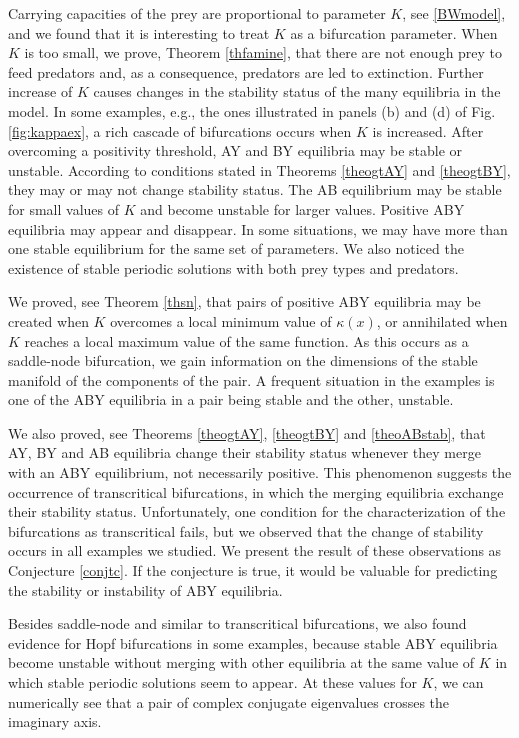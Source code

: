\documentclass[12pt]{article}
\theoremstyle{definition}
\begin{document}
Carrying capacities of the prey are proportional to parameter $K$, see \eqref{BWmodel}, and we found that it is interesting to treat $K$ as a bifurcation parameter. When $K$ is too small, we prove, Theorem \ref{thfamine}, that there are not enough prey to feed predators and, as a consequence, predators are led to extinction. Further increase of $K$ causes changes in the stability status of the many equilibria in the model. In some examples, e.g., the ones illustrated in panels (b) and (d) of Fig. \ref{fig:kappaex}, a rich cascade of bifurcations occurs when $K$ is increased. After overcoming a positivity threshold, AY and BY equilibria may be stable or unstable. According to conditions stated in Theorems \ref{theogtAY} and \ref{theogtBY}, they may or may not change stability status. The AB equilibrium may be stable for small values of $K$ and become unstable for larger values. Positive ABY equilibria may appear and disappear. In some situations, we may have more than one stable equilibrium for the same set of parameters. We also noticed the existence of stable periodic solutions with both prey types and predators.

We proved, see Theorem \ref{thsn}, that pairs of positive ABY equilibria may be created when $K$ overcomes a local minimum value of $\kappa(x)$, or annihilated when $K$ reaches a local maximum value of the same function. As this occurs as a saddle-node bifurcation, we gain information on the dimensions of the stable manifold of the components of the pair. A frequent situation in the examples is one of the ABY equilibria in a pair being stable and the other, unstable.

We also proved, see Theorems \ref{theogtAY}, \ref{theogtBY} and \ref{theoABstab}, that AY, BY and AB equilibria change their stability status whenever they merge with an ABY equilibrium, not necessarily positive. This phenomenon suggests the occurrence of transcritical bifurcations, in which the merging equilibria exchange their stability status. Unfortunately, one condition for the characterization of the bifurcations as transcritical fails, but we observed that the change of stability occurs in all examples we studied. We present the result of these observations as Conjecture \ref{conjtc}. If the conjecture is true, it would be valuable for predicting the stability or instability of ABY equilibria.

Besides saddle-node and similar to transcritical bifurcations, we also found evidence for Hopf bifurcations in some examples, because stable ABY equilibria become unstable without merging with other equilibria at the same value of $K$ in which stable periodic solutions seem to appear. At these values for $K$, we can numerically see that a pair of complex conjugate eigenvalues crosses the imaginary axis.
\end{document}
